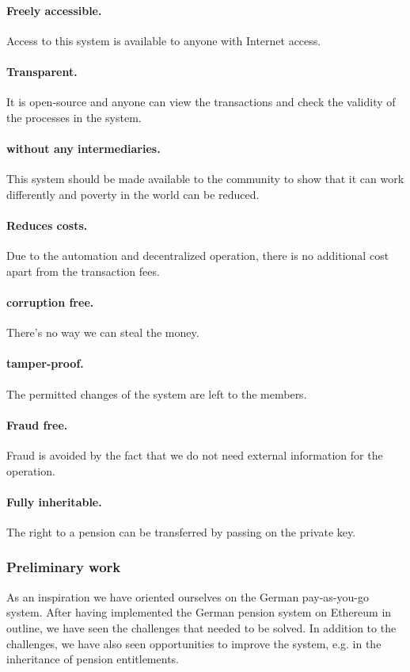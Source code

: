 \paragraph{Freely accessible.} Access to this system is available to anyone with Internet access.

\paragraph{Transparent.} It is open-source and anyone can view the transactions and check the validity of the processes in the system.

\paragraph{without any intermediaries.} This system should be made available to the community to show that it can work differently and poverty in the world can be reduced.

\paragraph{Reduces costs.} Due to the automation and decentralized operation, there is no additional cost apart from the transaction fees.

\paragraph{corruption free.} There's no way we can steal the money.

\paragraph{tamper-proof.} The permitted changes of the system are left to the members.

\paragraph{Fraud free.}
Fraud is avoided by the fact that we do not need external information for the operation. 

\paragraph{Fully inheritable.}
The right to a pension can be transferred by passing on the private key.


\subsubsection{Preliminary work}

As an inspiration we have oriented ourselves on the German pay-as-you-go system. After having implemented the German pension system on Ethereum in outline, we have seen the challenges that needed to be solved.
In addition to the challenges, we have also seen opportunities to improve the system, e.g. in the inheritance of pension entitlements.
